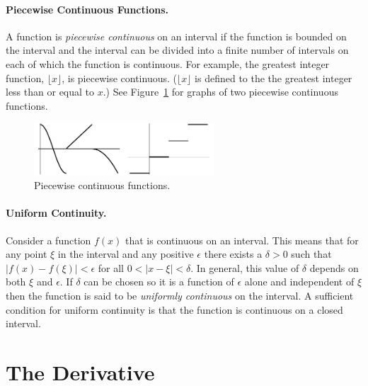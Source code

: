 \paragraph{Piecewise Continuous Functions.}
A function is \textit{piecewise continuous} on an interval if the function
is bounded on the interval and the interval can be divided into a finite
number of intervals on each of which the function is continuous.
For example, the greatest integer function, $\lfloor x \rfloor$, is piecewise
continuous.  ($\lfloor x \rfloor$ is defined to the the greatest integer
less than or equal to $x$.)  See Figure~\ref{pwcont} for graphs of 
two piecewise continuous functions.
\begin{figure}[h!]
  \begin{center}
    \includegraphics[width=0.6\textwidth]{calculus/differential/pwcont}
  \end{center}
  \caption{Piecewise continuous functions.}
  \label{pwcont}
\end{figure}





\paragraph{Uniform Continuity.}
Consider a function $f(x)$ that is continuous on an interval.  This means 
that for any point $\xi$ in the interval and any positive $\epsilon$ there
exists a $\delta > 0$ such that $| f(x) - f(\xi) | < \epsilon$ for all
$0 < | x - \xi | < \delta$.  In general, this value of $\delta$ depends on 
both $\xi$ and $\epsilon$.  If $\delta$ can be chosen so it is a function
of $\epsilon$ alone and independent of $\xi$ then the function is said to
be \textit{uniformly continuous} on the interval.  A sufficient condition
for uniform continuity is that the function is continuous on a closed interval.






\section{The Derivative}


